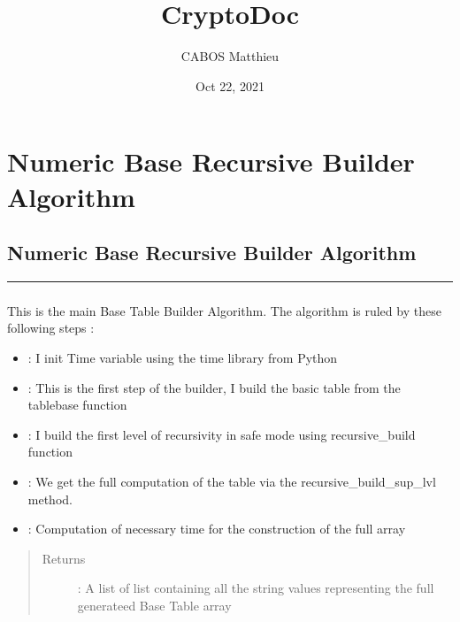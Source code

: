 \documentclass[letterpaper,10pt,english]{sphinxmanual}
\title{Crypto\sphinxhyphen{}Doc}
\date{Oct 22, 2021}
\author{CABOS Matthieu}
\begin{document}
\pagestyle{empty}
\sphinxmaketitle
\pagestyle{plain}
\sphinxtableofcontents
\pagestyle{normal}
\label{\detokenize{index::doc}}



\chapter{Numeric Base Recursive Builder Algorithm}
\label{\detokenize{base_opt_parallel:numeric-base-recursive-builder-algorithm}}\label{\detokenize{base_opt_parallel::doc}}
\newpage
\section{Numeric Base Recursive Builder Algorithm}
\label{\detokenize{Numeric_base_recursive_builder_algorithm:numeric-base-recursive-builder-algorithm}}\label{\detokenize{Numeric_base_recursive_builder_algorithm::doc}}
\sphinxAtStartPar
{}


\bigskip\hrule\bigskip



\subsection{}
\label{\detokenize{Numeric_base_recursive_builder_algorithm:algorithm}}
\sphinxAtStartPar
This is the main Base Table Builder Algorithm.
The algorithm is ruled by these following steps :
\begin{itemize}
\item {} 
\sphinxAtStartPar
{} : I init Time variable using the time library from Python

\item {} 
\sphinxAtStartPar
{} : This is the first step of the builder, I build the basic table from the tablebase function

\item {} 
\sphinxAtStartPar
{} : I build the first level of recursivity in safe mode using recursive\_build function

\item {} 
\sphinxAtStartPar
{} : We get the full computation of the table via the recursive\_build\_sup\_lvl method.

\item {} 
\sphinxAtStartPar
{} : Computation of necessary time for the construction of the full array

\end{itemize}
\begin{quote}\begin{description}
\item[{Returns}] \leavevmode
\sphinxAtStartPar
{} : A list of list containing all the string values representing the full generateed Base Table array

\end{description}\end{quote}
\end{document}
